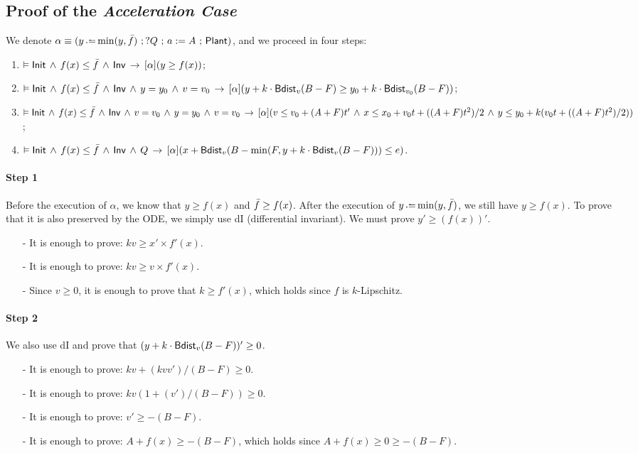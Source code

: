 \subsection{Proof of the \emph{Acceleration Case}}
We denote $\alpha \equiv (y \dlassign \min(y, \TrainFxMax) \seq ?Q \seq a:=A \seq \Plant)$, and we proceed in four steps:
\begin{enumerate}
    \item $\vDash \mathsf{Init} \, \land \, f(x) \le \bar {f} \, \land \, \mathsf{Inv} \,\rightarrow\, [\alpha] (y \ge f(x))$;
    \item $\vDash \mathsf{Init} \, \land \, f(x) \le \bar {f} \, \land \, \mathsf{Inv} \, \land \, y = y_0 \, \land \, v = v_0 \,\rightarrow\, [\alpha] (y + k \cdot \textsf{Bdist}_{v}(B-F) \ge y_0 + k \cdot \textsf{Bdist}_{v_0}(B-F))$;
    \item $\vDash \mathsf{Init} \, \land \, f(x) \le \bar {f} \, \land \, \mathsf{Inv} \, \land \, v = v_0 \, \land \, y = y_0 \, \land \, v = v_0 \,\rightarrow\, [\alpha] (v \le v_0+(A+F)t' \, \land \, x \le x_0+v_0t+((A+F)t^2)/2 \, \land \, y \le y_0+k(v_0t+((A+F)t^2)/2))$;
    \item $\vDash \mathsf{Init} \, \land \, f(x) \le \bar {f} \, \land \, \mathsf{Inv} \, \land \, Q \,\rightarrow\, [\alpha] (x + \textsf{Bdist}_{v}(B - \min(F, y + k \cdot \textsf{Bdist}_{v}(B-F))) \le e)$.
\end{enumerate}

\paragraph{Step 1} Before the execution of $\alpha$, we know that $y \ge f(x)$ and $\bar {f} \ge f(x)$. After the execution of $y \dlassign \min(y, \TrainFxMax)$, we still have $y \ge f(x)$. To prove that it is also preserved by the ODE, we simply use dI (differential invariant). We must prove $y' \ge (f(x))'$.
\begin{itemize}
    \item[-] It is enough to prove: $k v \ge x' \times f'(x)$.
    \item[-] It is enough to prove: $k v \ge v \times f'(x)$.
    \item[-] Since $v \ge 0$, it is enough to prove that $k \ge f'(x)$, which holds since $f$ is $k$-Lipschitz.
\end{itemize}

\paragraph{Step 2} We also use dI and prove that $(y + k \cdot \textsf{Bdist}_{v}(B-F))' \ge 0$.
\begin{itemize}
    \item[-] It is enough to prove: $k v + (k v v') / (B - F) \ge 0$.
    \item[-] It is enough to prove: $k v (1 + (v')/(B-F)) \ge 0$.
    \item[-] It is enough to prove: $v' \ge -(B-F)$.
    \item[-] It is enough to prove: $A + f(x) \ge -(B-F)$, which holds since $A+f(x) \ge 0 \ge -(B-F)$.
\end{itemize}

